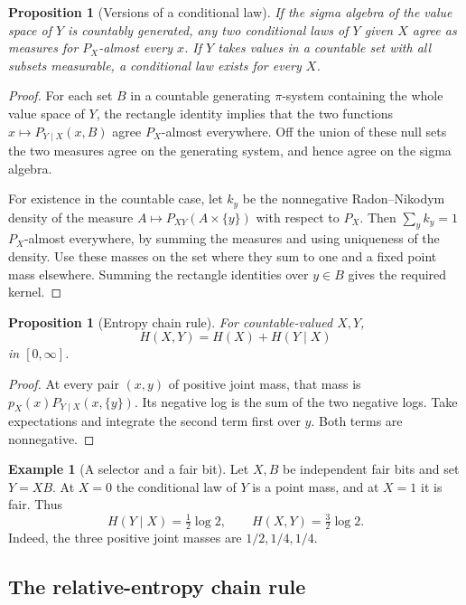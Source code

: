 \documentclass[11pt,oneside]{book}
\newtheorem{proposition}[theorem]{Proposition}
\theoremstyle{definition}
\newtheorem{example}[theorem]{Example}
\theoremstyle{remark}
\begin{document}
\begin{proposition}[Versions of a conditional law]
\label{prop:conditional-law-versions}
If the sigma algebra of the value space of $Y$ is countably
generated, any two conditional laws of $Y$ given $X$ agree as
measures for $P_X$-almost every $x$. If $Y$ takes values in a
countable set with all subsets measurable, a conditional law
exists for every $X$.
\end{proposition}
\begin{proof}
For each set $B$ in a countable generating $\pi$-system containing
the whole value space of $Y$, the rectangle identity implies that
the two functions $x\mapsto P_{Y\mid X}(x,B)$ agree $P_X$-almost
everywhere. Off the union of these null sets the two measures agree
on the generating system, and hence agree on the sigma algebra.

For existence in the countable case, let $k_y$ be the nonnegative
Radon--Nikodym density of the measure $A\mapsto P_{XY}(A\times\{y\})$
with respect to $P_X$. Then $\sum_y k_y=1$ $P_X$-almost everywhere,
by summing the measures and using uniqueness of the density.
Use these masses on the set where they sum to one and a fixed point
mass elsewhere. Summing the rectangle identities over $y\in B$
gives the required kernel.
\end{proof}

\begin{proposition}[Entropy chain rule]
\label{prop:discrete-entropy-chain-rule}
For countable-valued $X,Y$,
\[
H(X,Y)=H(X)+H(Y\mid X)
\]
in $[0,\infty]$.
\end{proposition}
\begin{proof}
At every pair $(x,y)$ of positive joint mass, that mass is
$p_X(x)P_{Y\mid X}(x,\{y\})$. Its negative log is the sum of the
two negative logs. Take expectations and integrate the second
term first over $y$. Both terms are nonnegative.
\end{proof}

\begin{example}[A selector and a fair bit]
\label{ex:conditional-entropy-selector}
Let $X,B$ be independent fair bits and set $Y=XB$.
At $X=0$ the conditional law of $Y$ is a point mass, and at $X=1$
it is fair. Thus
\[
H(Y\mid X)=\tfrac12\log 2,\qquad
H(X,Y)=\tfrac32\log 2.
\]
Indeed, the three positive joint masses are $1/2,1/4,1/4$.
\end{example}

\subsection{The relative-entropy chain rule}
\label{subsec:relative-entropy-chain-rule}
\end{document}
